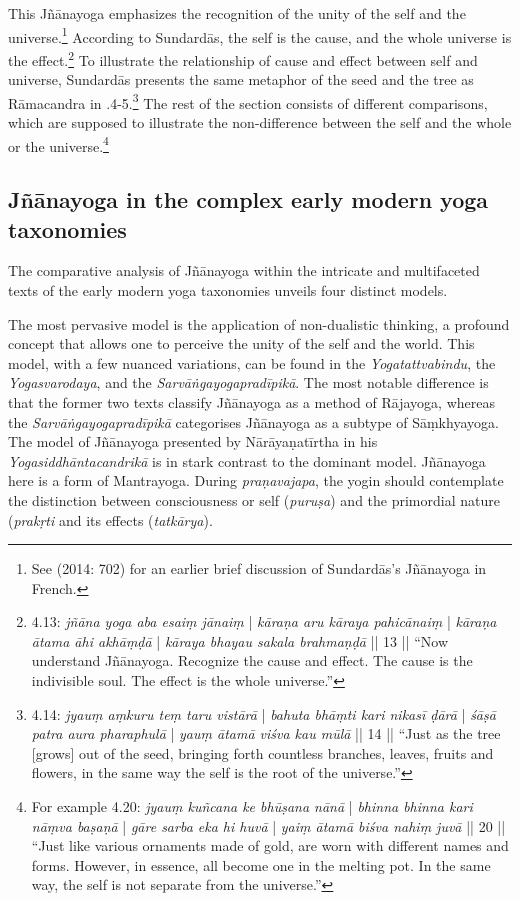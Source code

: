 This Jñānayoga emphasizes the recognition of the unity of the self and the universe.\footnote{See \citeauthor{burger2014sarvangayogapradipika} (2014: 702) for an earlier brief discussion of Sundardās's Jñānayoga in French.} According to Sundardās, the self is the cause, and the whole universe is the effect.\footnote{ 4.13: \textit{jñāna yoga aba esaiṃ jānaiṃ} | \textit{kāraṇa aru kāraya pahicānaiṃ} | \textit{kāraṇa ātama āhi akhāṃḍā} | \textit{kāraya bhayau sakala brahmaṇḍā} || 13 || ``Now understand Jñānayoga. Recognize the cause and effect. The cause is the indivisible soul. The effect is the whole universe.''} To illustrate the relationship of cause and effect between self and universe, Sundardās presents the same metaphor of the seed and the tree as Rāmacandra in .4-5.\footnote{ 4.14: \textit{jyauṃ aṃkuru teṃ taru vistārā} | \textit{bahuta bhāṃti kari nikasī ḍārā} | \textit{śāṣā patra aura pharaphulā} | \textit{yauṃ ātamā viśva kau mūlā} || 14 || ``Just as the tree [grows] out of the seed, bringing forth countless branches, leaves, fruits and flowers, in the same way the self is the root of the universe.''} The rest of the section consists of different comparisons, which are supposed to illustrate the non-difference between the self and the whole or the universe.\footnote{For example  4.20: \textit{jyauṃ kuñcana ke bhūṣana nānā} | \textit{bhinna bhinna kari nāṃva baṣaṇā} | \textit{gāre sarba eka hi huvā} | \textit{yaiṃ ātamā biśva nahiṃ juvā} || 20 || ``Just like various ornaments made of gold, are worn with different names and forms. However, in essence, all become one in the melting pot. In the same way, the self is not separate from the universe.''} 

\subsection{Jñānayoga in the complex early modern yoga taxonomies}

The comparative analysis of Jñānayoga within the intricate and multifaceted texts of the early modern yoga taxonomies unveils four distinct models.  

The most pervasive model is the application of non-dualistic thinking, a profound concept that allows one to perceive the unity of the self and the world. This model, with a few nuanced variations, can be found in the \textit{Yogatattvabindu}, the \textit{Yogasvarodaya}, and the \textit{Sarvāṅgayogapradīpikā}. The most notable difference is that the former two texts classify Jñānayoga as a method of Rājayoga, whereas the \textit{Sarvāṅgayogapradīpikā} categorises Jñānayoga as a subtype of Sāṃkhyayoga. 
The model of Jñānayoga presented by Nārāyaṇatīrtha in his \textit{Yogasiddhāntacandrikā} is in stark contrast to the dominant model. Jñānayoga here is a form of Mantrayoga. During \textit{praṇavajapa}, the yogin should contemplate the distinction between consciousness or self (\textit{puruṣa}) and the primordial nature (\textit{prakṛti} and its effects (\textit{tatkārya}).    

